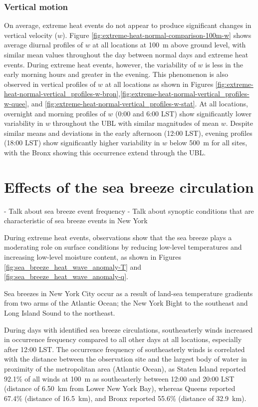 \documentclass[11pt,a4paper]{article}
\begin{document}
\subsubsection{Vertical motion}
On average, extreme heat events do not appear to produce significant changes in vertical velocity ($w$). Figure \ref{fig:extreme-heat-normal-comparison-100m-w} shows average diurnal profiles of $w$ at all locations at \SI{100}{\meter} above ground level, with similar mean values throughout the day between normal days and extreme heat events. During extreme heat events, however, the variability of $w$ is less in the early morning hours and greater in the evening. This phenomenon is also observed in vertical profiles of $w$ at all locations as shown in Figures \ref{fig:extreme-heat-normal-vertical_profiles-w-bron},\ref{fig:extreme-heat-normal-vertical_profiles-w-quee}, and \ref{fig:extreme-heat-normal-vertical_profiles-w-stat}. At all locations, overnight and morning profiles of $w$ (0:00 and 6:00 LST) show significantly lower variability in $w$ throughout the UBL with similar magnitudes of mean $w$. Despite similar means and deviations in the early afternoon (12:00 LST), evening profiles (18:00 LST) show significantly higher variability in $w$ below \SI{500}{\meter} for all sites, with the Bronx showing this occurrence extend through the UBL.

\section{Effects of the sea breeze circulation} \label{section:sea_breeze_effects}

- Talk about sea breeze event frequency
- Talk about synoptic conditions that are characteristic of sea breeze events in New York


During extreme heat events, observations show that the sea breeze plays a moderating role on surface conditions by reducing low-level temperatures and increasing low-level moisture content, as shown in Figures \ref{fig:sea_breeze_heat_wave_anomaly-T} and \ref{fig:sea_breeze_heat_wave_anomaly-q}. 

Sea breezes in New York City occur as a result of land-sea temperature gradients from two arms of the Atlantic Ocean; the New York Bight to the southeast and Long Island Sound to the northeast. 

During days with identified sea breeze circulations, southeasterly winds increased in occurrence frequency compared to all other days at all locations, especially after 12:00 LST. The occurrence frequency of southeasterly winds is correlated with the distance between the observation site and the largest body of water in proximity of the metropolitan area (Atlantic Ocean), as Staten Island reported 92.1\% of all winds at \SI{100}{\meter} as southeasterly between 12:00 and 20:00 LST (distance of \SI{6.50}{\kilo\meter} from Lower New York Bay), whereas Queens reported 67.4\% (distance of \SI{16.5}{\kilo\meter}), and Bronx reported 55.6\% (distance of \SI{32.9}{\kilo\meter}). 
\end{document}
